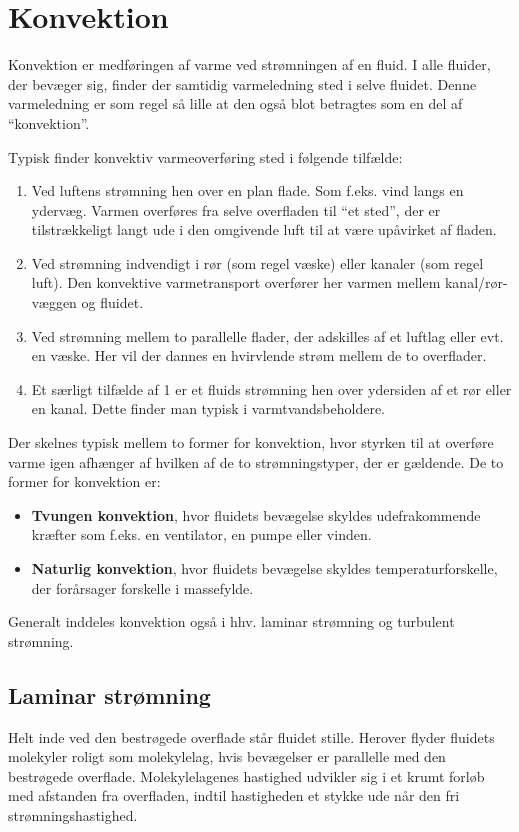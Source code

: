 \section{Konvektion}
Konvektion er medføringen af varme ved strømningen af en fluid. I alle fluider, der bevæger sig, finder der samtidig varmeledning sted i selve fluidet. Denne varmeledning er som regel så lille at den også blot betragtes som en del af ``konvektion''.

Typisk finder konvektiv varmeoverføring sted i følgende tilfælde:
\begin{enumerate}
  \item Ved luftens strømning hen over en plan flade. Som f.eks. vind langs en ydervæg. Varmen overføres fra selve  overfladen til ``et sted'', der er tilstrækkeligt langt ude i den omgivende luft til at være upåvirket af fladen.
  \item Ved strømning indvendigt i rør (som regel væske) eller kanaler (som regel luft). Den konvektive varmetransport overfører her varmen mellem kanal/rør-væggen og fluidet. 
  \item Ved strømning mellem to parallelle flader, der adskilles af et luftlag eller evt. en væske. Her vil der dannes en hvirvlende strøm mellem de to overflader.
  \item Et særligt tilfælde af 1 er et fluids strømning hen over ydersiden af et rør eller en kanal. Dette finder man typisk i varmtvandsbeholdere. 
\end{enumerate}

Der skelnes typisk mellem to former for konvektion, hvor styrken til at overføre varme igen afhænger af hvilken af de to strømningstyper, der er gældende. De to former for konvektion er:
\begin{itemize}
  \item \textbf{Tvungen konvektion}, hvor fluidets bevægelse skyldes udefrakommende kræfter som f.eks. en ventilator, en pumpe eller vinden. 
  \item \textbf{Naturlig konvektion}, hvor fluidets bevægelse skyldes temperaturforskelle, der forårsager forskelle i massefylde. 
\end{itemize}

Generalt inddeles konvektion også i hhv. laminar strømning og turbulent strømning.

\subsection{Laminar strømning}
Helt inde ved den bestrøgede overflade står fluidet stille. Herover flyder fluidets molekyler roligt som molekylelag, hvis bevægelser er parallelle med den bestrøgede overflade. Molekylelagenes hastighed udvikler sig i et krumt forløb med afstanden fra overfladen, indtil hastigheden et stykke ude når den fri strømningshastighed. 

